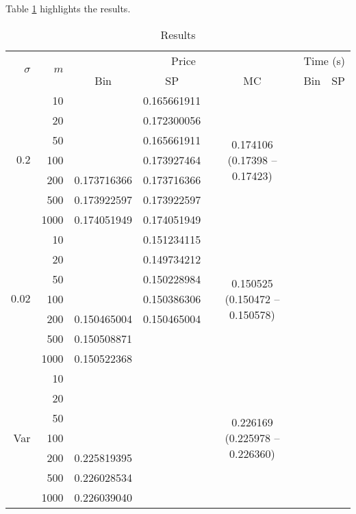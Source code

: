 Table \ref{tab:clq-results} highlights the results.
\begin{table}[h]
	\centering
	\caption{Results}
	\label{tab:clq-results}
	\begin{tabular}{rrccccc}
		\toprule
		\multirow{2}{1em}{$ \sigma $}  &  \multirow{2}{1em}{$ m $}
		&  \multicolumn{3}{c}{Price}  &  \multicolumn{2}{c}{Time (s)}  \\
		\cmidrule(lr){3-5}\cmidrule(lr){6-7}
		&&  Bin  &  SP  &  MC  &  Bin  &  SP  \\
		\midrule
		\multirow{7}{2em}{$ 0.2 $}
		&    10  &    &  0.165661911  &  \multirow{7}{5em}{0.174106 (0.17398 -- 0.17423)}  &    &    \\
		&    20  &    &  0.172300056  &    &    &    \\
		&    50  &    &  0.165661911  &    &    &    \\
		&   100  &    &  0.173927464  &    &    &    \\
		&   200  &  0.173716366  &  0.173716366  &    &    &    \\
		&   500  &  0.173922597  &  0.173922597  &    &    &    \\
		&  1000  &  0.174051949  &  0.174051949  &    &    &    \\
		\midrule
		\multirow{7}{2em}{$ 0.02 $}
		&    10  &    &  0.151234115  &  \multirow{7}{5em}{0.150525 (0.150472 -- 0.150578)}  &    &    \\
		&    20  &    &  0.149734212  &    &    &    \\
		&    50  &    &  0.150228984  &    &    &    \\
		&   100  &    &  0.150386306  &    &    &    \\
		&   200  &  0.150465004  &  0.150465004  &    &    &    \\
		&   500  &  0.150508871  &    &    &    &    \\
		&  1000  &  0.150522368  &    &    &    &    \\
		\midrule
		\multirow{7}{2em}{Var}
		&    10  &    &    &  \multirow{7}{5em}{0.226169 (0.225978 -- 0.226360)}  &    &    \\
		&    20  &    &    &    &    &    \\
		&    50  &    &    &    &    &    \\
		&   100  &    &    &    &    &    \\
		&   200  &  0.225819395  &    &    &    &    \\
		&   500  &  0.226028534  &    &    &    &    \\
		&  1000  &  0.226039040  &    &    &    &    \\
		\bottomrule
	\end{tabular}
\end{table}


